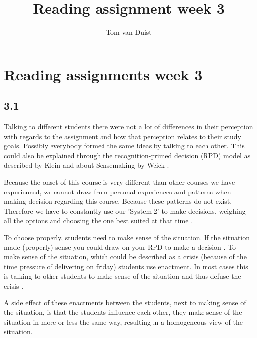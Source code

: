 

\title{Reading assignment week 3}
\newcommand{\TitelAbbr}{}
\newcommand{\Version}{0.1}



\what{}
\supervisors{}
\author{Tom van Duist}




\maketitle

\clearpage


\chapter*{Reading assignments week 3}

\section*{3.1}
Talking to different students there were not a lot of differences in their perception with regards to the assignment and how that perception relates to their study goals. Possibly everybody formed the same ideas by talking to each other. This could also be explained through the recognition-primed decision (RPD) model as described by Klein \cite{klein} and about Sensemaking by Weick \cite{weick}.

Because the onset of this course is very different than other courses we have experienced, we cannot draw from personal experiences and patterns when making decision regarding this course. Because these patterns do not exist. Therefore we have to constantly use our 'System 2' to make decisions, weighing all the options and choosing the one best suited at that time \cite{klein}.

To choose properly, students need to make sense of the situation. If the situation made (properly) sense you could draw on your RPD to make a decision \cite{klein}. To make sense of the situation, which could be described as a crisis (because of the time pressure of delivering on friday) students use enactment. In most cases this is talking to other students to make sense of the situation and thus defuse the crisis \cite{weick}.

A side effect of these enactments between the students, next to making sense of the situation, is that the students influence each other, they make sense of the situation in more or less the same way, resulting in a homogeneous view of the situation.

